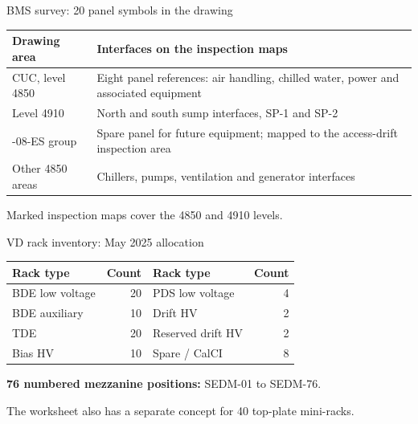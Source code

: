 \begin{frame}{BMS survey: 20 panel symbols in the drawing}
  \renewcommand{\arraystretch}{1.4}
  \begin{tabularx}{\textwidth}{@{}>{\RaggedRight\arraybackslash}p{3.4cm}>{\RaggedRight\arraybackslash}X@{}}
    \toprule
    \textbf{Drawing area} & \textbf{Interfaces on the inspection maps}\\
    \midrule
    CUC, level 4850 & Eight panel references: air handling, chilled water, power and associated equipment\\
    Level 4910 & North and south sump interfaces, SP-1 and SP-2\\
    4850-08-ES group & Spare panel for future equipment; mapped to the access-drift inspection area\\
    Other 4850 areas & Chillers, pumps, ventilation and generator interfaces\\
    \bottomrule
  \end{tabularx}\par
  \medskip
  Marked inspection maps cover the 4850 and 4910 levels.
\end{frame}

\begin{frame}{VD rack inventory: May 2025 allocation}
  \renewcommand{\arraystretch}{1.15}
  \begin{tabularx}{\textwidth}{@{}>{\RaggedRight\arraybackslash}Xr>{\RaggedRight\arraybackslash}Xr@{}}
    \toprule
    \textbf{Rack type} & \textbf{Count} & \textbf{Rack type} & \textbf{Count}\\
    \midrule
    BDE low voltage & 20 & PDS low voltage & 4\\
    BDE auxiliary & 10 & Drift HV & 2\\
    TDE & 20 & Reserved drift HV & 2\\
    Bias HV & 10 & Spare / CalCI & 8\\
    \bottomrule
  \end{tabularx}\par
  \bigskip
  \textbf{76 numbered mezzanine positions:} SEDM-01 to SEDM-76.\par
  \medskip
  The worksheet also has a separate concept for 40 top-plate mini-racks.
\end{frame}



